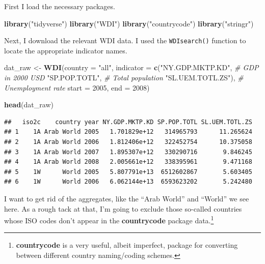 \documentclass[
  12pt,
  oneside,openany]{book}
\newenvironment{Shaded}{\begin{snugshade}}{\end{snugshade}}
\newcommand{\CommentTok}[1]{\textcolor[rgb]{0.56,0.35,0.01}{\textit{#1}}}
\newcommand{\DataTypeTok}[1]{\textcolor[rgb]{0.13,0.29,0.53}{#1}}
\newcommand{\DecValTok}[1]{\textcolor[rgb]{0.00,0.00,0.81}{#1}}
\newcommand{\KeywordTok}[1]{\textcolor[rgb]{0.13,0.29,0.53}{\textbf{#1}}}
\newcommand{\NormalTok}[1]{#1}
\newcommand{\StringTok}[1]{\textcolor[rgb]{0.31,0.60,0.02}{#1}}
\begin{document}
First I load the necessary packages.

\begin{Shaded}
\begin{Highlighting}[]
\KeywordTok{library}\NormalTok{(}\StringTok{"tidyverse"}\NormalTok{)}
\KeywordTok{library}\NormalTok{(}\StringTok{"WDI"}\NormalTok{)}
\KeywordTok{library}\NormalTok{(}\StringTok{"countrycode"}\NormalTok{)}
\KeywordTok{library}\NormalTok{(}\StringTok{"stringr"}\NormalTok{)}
\end{Highlighting}
\end{Shaded}

Next, I download the relevant WDI data. I used the \texttt{WDIsearch()} function to locate the appropriate indicator names.

\begin{Shaded}
\begin{Highlighting}[]
\NormalTok{dat\_raw \textless{}{-}}\StringTok{ }\KeywordTok{WDI}\NormalTok{(}\DataTypeTok{country =} \StringTok{"all"}\NormalTok{,}
               \DataTypeTok{indicator =} \KeywordTok{c}\NormalTok{(}\StringTok{"NY.GDP.MKTP.KD"}\NormalTok{,  }\CommentTok{\# GDP in 2000 USD}
                             \StringTok{"SP.POP.TOTL"}\NormalTok{,     }\CommentTok{\# Total population}
                             \StringTok{"SL.UEM.TOTL.ZS"}\NormalTok{), }\CommentTok{\# Unemployment rate}
               \DataTypeTok{start =} \DecValTok{2005}\NormalTok{,}
               \DataTypeTok{end =} \DecValTok{2008}\NormalTok{)}

\KeywordTok{head}\NormalTok{(dat\_raw)}
\end{Highlighting}
\end{Shaded}

\begin{verbatim}
##   iso2c    country year NY.GDP.MKTP.KD SP.POP.TOTL SL.UEM.TOTL.ZS
## 1    1A Arab World 2005   1.701829e+12   314965793      11.265624
## 2    1A Arab World 2006   1.812406e+12   322452754      10.375058
## 3    1A Arab World 2007   1.895307e+12   330290716       9.846245
## 4    1A Arab World 2008   2.005661e+12   338395961       9.471168
## 5    1W      World 2005   5.807791e+13  6512602867       5.603405
## 6    1W      World 2006   6.062144e+13  6593623202       5.242480
\end{verbatim}

I want to get rid of the aggregates, like the ``Arab World'' and ``World'' we see here. As a rough tack at that, I'm going to exclude those so-called countries whose ISO codes don't appear in the \textbf{countrycode} package data.\footnote{\textbf{countrycode} is a very useful, albeit imperfect, package for converting between different country naming/coding schemes.}
\end{document}

